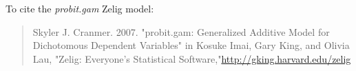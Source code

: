 To cite the \emph{ probit.gam } Zelig model:
 \begin{verse}
 Skyler J. Cranmer. 2007. "probit.gam: Generalized Additive Model for Dichotomous Dependent Variables" in Kosuke Imai, Gary King, and Olivia Lau, "Zelig: Everyone's Statistical Software,"\url{http://gking.harvard.edu/zelig} 
\end{verse}